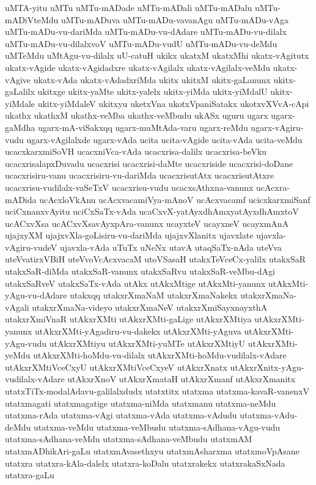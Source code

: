 {uMTA-yitu
uMTu
uMTu-mADade
uMTu-mADali
uMTu-mADalu
uMTu-mADiVteMdu
uMTu-mADuva
uMTu-mADu-vavanAgu
uMTu-mADu-vAga
uMTu-mADu-vu-dariMda
uMTu-mADu-vu-dAdare
uMTu-mADu-vu-dilalx
uMTu-mADu-vu-dilalxvoV
uMTu-mADu-vudU
uMTu-mADu-vu-deMdu
uMTeMdu
uMtAgu-vu-dilalx
uU-catuH
ukikx
ukatxM
ukatxMhi
ukatx-vAgitutx
ukatx-vAgide
ukatx-vAgidadxre
ukatx-vAgilalx
ukatx-vAgilalx-veMdu
ukatx-vAgive
ukatx-vAda
ukatx-vAdadxriMda
ukitx
ukitxM
ukitx-gaLanunx
ukitx-gaLalilx
ukitxge
ukitx-yaMte
ukitx-yalelx
ukitx-yiMda
ukitx-yiMdalU
ukitx-yiMdale
ukitx-yiMdaleV
ukitxyu
uketxVna
ukotxVpaniSatakx
ukotxvXVvA-cApi
ukathx
ukathxM
ukathx-veMba
ukathx-veMbudu
ukASx
uguru
ugarx
ugarx-gaMdha
ugarx-mA-viSakxqq
ugarx-muMtAda-varu
ugarx-reMdu
ugarx-vAgiru-vudu
ugarx-vAgilalxde
ugarx-vAda
ucita
ucita-vAgide
ucita-vAda
ucita-veMdu
ucacxkarxmiSoVH
ucacxniVca-vAda
ucacxrisa-dalilx
ucacxrisa-beVku
ucacxrisalapxDuvadu
ucacxrisi
ucacxrisi-daMte
ucacxriside
ucacxrisi-doDane
ucacxrisiru-vanu
ucacxrisiru-vu-dariMda
ucacxrisutAtx
ucacxrisutAtxre
ucacxrisu-vudilalx-vaSeTxV
ucacxrisu-vudu
ucacxsAthxna-vanunx
ucAcxra-mADida
ucAcxloVkAnu
ucAcxvacamiVya-mAnoV
ucAcxvacamf
ucicxkarxmiSanf
uciCxnanxvAyitu
uciCxSaTx-vAda
ucaCxvX-yatAyxdhAmxyatAyxdhAmxtoV
ucACxvXsa
ucACxvXsavAyxpAra-vanunx
ucayxteV
ucayxneV
ucayxmAnA
ujajxyXM
ujajxvXla-goLisiru-vu-dariMda
ujajxvXlanitx
ujavxlate
ujavxla-vAgiru-vudeV
ujavxla-vAda
uTuTx
uNeNx
utavA
utaqSaTx-nAda
uteVva
uteVvatirxVBiH
uteVvoVcAcxvacaM
utoVSasaH
utakxTeVceCx-yalilx
utakxSaR
utakxSaR-diMda
utakxSaR-vanunx
utakxSaRvu
utakxSaR-veMbu-dAgi
utakxSaRveV
utakxSaTx-vAda
utAkx
utAkxMtige
utAkxMti-yanunx
utAkxMti-yAgu-vu-dAdare
utakxqq
utakxrXmaNaM
utakxrXmaNakekx
utakxrXmaNa-vAgali
utakxrXmaNa-videyo
utakxrXmaNeV
utakxrXmiSayxnayxthA
utakxrXmiVnaR
utAkxrXMti
utAkxrXMti-gaLige
utAkxrXMtiya
utAkxrXMti-yanunx
utAkxrXMti-yAgadiru-vu-dakekx
utAkxrXMti-yAguva
utAkxrXMti-yAgu-vudu
utAkxrXMtiyu
utAkxrXMti-yuMTe
utAkxrXMtiyU
utAkxrXMti-yeMdu
utAkxrXMti-hoMdu-vu-dilalx
utAkxrXMti-hoMdu-vudilalx-vAdare
utAkxrXMtiVceCxyU
utAkxrXMtiVceCxyeV
utAkxrXnatx
utAkxrXnitx-yAgu-vudilalx-vAdare
utAkxrXnoV
utAkxrXmataH
utAkxrXmanf
utAkxrXmanitx
utatxTiTx-modalAdavu-galilalxdudx
utatxtitx
utatxma
utatxma-kavaR-vanenxV
utatxmagati
utatxmagatige
utatxma-niMda
utatxmanu
utatxma-neMdu
utatxma-rAda
utatxma-vAgi
utatxma-vAda
utatxma-vAdudu
utatxma-vAdu-deMdu
utatxma-veMdu
utatxma-veMbudu
utatxma-sAdhana-vAgu-vudu
utatxma-sAdhana-veMdu
utatxma-sAdhana-veMbudu
utatxmAM
utatxmADhikAri-gaLu
utatxmAvasethxyu
utatxmAsharxma
utatxmoVpAsane
utatxra
utatxra-kAla-dalelx
utatxra-koDalu
utatxrakekx
utatxrakaSxNada
utatxra-gaLu
}
